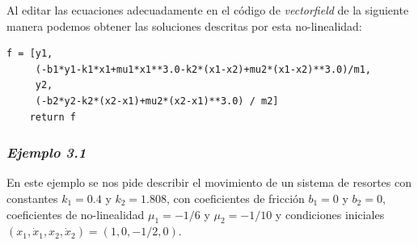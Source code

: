 \documentclass{article}
\begin{document}
Al editar las ecuaciones adecuadamente en el código de \textit{vectorfield} de la siguiente manera podemos obtener las soluciones descritas por esta no-linealidad:
\begin{framed}
\begin{verbatim}
f = [y1,
     (-b1*y1-k1*x1+mu1*x1**3.0-k2*(x1-x2)+mu2*(x1-x2)**3.0)/m1,
     y2,
     (-b2*y2-k2*(x2-x1)+mu2*(x2-x1)**3.0) / m2]
    return f
\end{verbatim}
\end{framed} 

\subsubsection*{\textit{Ejemplo 3.1}}
En este ejemplo se nos pide describir el movimiento de un sistema de resortes con constantes $k_1=0.4$ y $k_2=1.808$, con coeficientes de fricción $b_1=0$ y $b_2=0$, coeficientes de no-linealidad $\mu_1=-1/6$ y $\mu_2=-1/10$ y condiciones iniciales $(x_1,\dot{x}_1,x_2,\dot{x}_2)=(1,0,-1/2,0)$.
\end{document}
